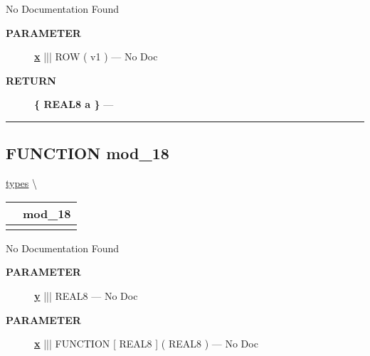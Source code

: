 No Documentation Found






\par
\begin{description}
\item [\colorbox{tagtype}{\color{white} \textbf{\textsf{PARAMETER}}}] \textbf{\underline{x}} ||| ROW ( v1 ) --- No Doc
\end{description}







\par
\begin{description}
\item [\colorbox{tagtype}{\color{white} \textbf{\textsf{RETURN}}}] \textbf{\{ REAL8 a \}} --- 
\end{description}




\rule{\linewidth}{0.5pt}
\subsection*{\textsf{\colorbox{headtoc}{\color{white} FUNCTION}
mod\_18}}

\hypertarget{ecldoc:types.mod_18}{}
\hspace{0pt} \hyperlink{ecldoc:types}{types} \textbackslash 

{\renewcommand{\arraystretch}{1.5}
\begin{tabularx}{\textwidth}{|>{\raggedright\arraybackslash}l|X|}
\hline
\hspace{0pt}\mytexttt{\color{red} } & \textbf{mod\_18} \\
\hline
\multicolumn{2}{|>{\raggedright\arraybackslash}X|}{\hspace{0pt}\mytexttt{\color{param} (REAL8 x(REAL8 z), REAL8 y)}} \\
\hline
\end{tabularx}
}

\par





No Documentation Found






\par
\begin{description}
\item [\colorbox{tagtype}{\color{white} \textbf{\textsf{PARAMETER}}}] \textbf{\underline{y}} ||| REAL8 --- No Doc
\item [\colorbox{tagtype}{\color{white} \textbf{\textsf{PARAMETER}}}] \textbf{\underline{x}} ||| FUNCTION [ REAL8 ] ( REAL8 ) --- No Doc
\end{description}







